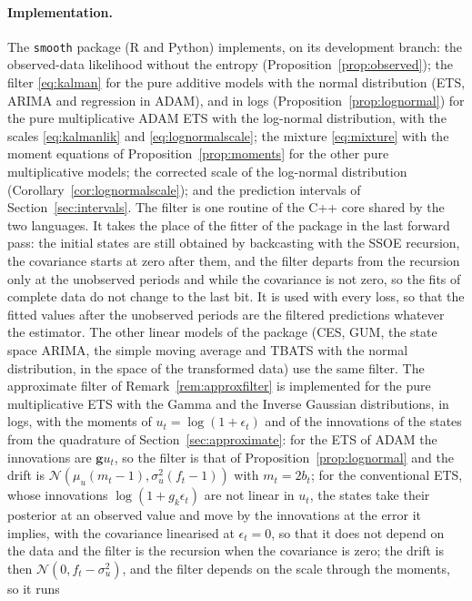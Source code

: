 \documentclass[11pt,a4paper]{article}
\newcommand{\vect}[1]{\mathbf{#1}}
\theoremstyle{remark}
\begin{document}
\paragraph{Implementation.} The \texttt{smooth} package (R and Python) implements, on its
development branch: the observed-data likelihood without the entropy (Proposition~\ref{prop:observed});
the filter \eqref{eq:kalman} for the pure additive models with the normal distribution (ETS, ARIMA
and regression in ADAM), and in logs (Proposition~\ref{prop:lognormal}) for the pure multiplicative
ADAM ETS with the log-normal distribution, with the scales \eqref{eq:kalmanlik} and
\eqref{eq:lognormalscale}; the mixture \eqref{eq:mixture} with the moment equations of
Proposition~\ref{prop:moments} for the other pure multiplicative models; the corrected scale of the
log-normal distribution (Corollary~\ref{cor:lognormalscale}); and the prediction intervals of
Section~\ref{sec:intervals}. The filter is one routine of the C++ core shared by the two languages.
It takes the place of the fitter of the package in the last forward pass: the initial states are
still obtained by backcasting with the SSOE recursion, the covariance starts at zero after them, and
the filter departs from the recursion only at the unobserved periods and while the covariance is not
zero, so the fits of complete data do not change to the last bit. It is used with every loss, so
that the fitted values after the unobserved periods are the filtered predictions whatever the
estimator. The other linear models of the package (CES, GUM, the state space ARIMA, the simple
moving average and TBATS with the normal distribution, in the space of the transformed data) use the
same filter. The approximate filter of Remark~\ref{rem:approxfilter} is implemented for the pure
multiplicative ETS with the Gamma and the Inverse Gaussian distributions, in logs, with the moments of
$u_t = \log(1+\epsilon_t)$ and of the innovations of the states from the quadrature of
Section~\ref{sec:approximate}: for the ETS of ADAM the innovations are $\vect g u_t$, so the filter is
that of Proposition~\ref{prop:lognormal} and the drift is $\mathcal N(\mu_u (m_t-1), \sigma_u^2
(f_t-1))$ with $m_t = 2b_t$; for the conventional ETS, whose innovations $\log(1+g_k\epsilon_t)$ are
not linear in $u_t$, the states take their posterior at an observed value and move by the innovations
at the error it implies, with the covariance linearised at $\epsilon_t = 0$, so that it does not depend
on the data and the filter is the recursion when the covariance is zero; the drift is then
$\mathcal N(0, f_t - \sigma_u^2)$, and the filter depends on the scale through the moments, so it runs
\end{document}
